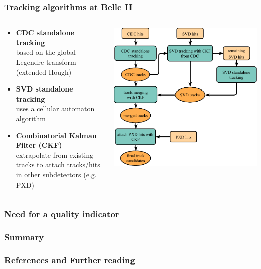 \documentclass[18pt, aspectratio=169]{beamer}
\newcommand{\kitemph}[1]{\textcolor{kit-green100}{\bf{#1}}}
\begin{document}
\begin{frame}
  \frametitle{Tracking algorithms at Belle II}
  \begin{columns}
    \begin{column}{0.53\textwidth}
      \begin{itemize}
      \item \kitemph{CDC standalone tracking}\\
        based on the global Legendre transform (extended Hough)
      \item \kitemph{SVD standalone tracking}\\
        uses a cellular automaton algorithm
      \item \kitemph{Combinatorial Kalman Filter (CKF)}\\
        extrapolate from existing tracks to attach tracks/hits in other subdetectors (e.g. PXD)
      \end{itemize}
    \end{column}
    \begin{column}{0.47\textwidth}
      \centering
      \includegraphics[width=\textwidth]{figures/full_track_finding_simplified.pdf}
    \end{column}
  \end{columns}
\end{frame}
\begin{frame}
  \frametitle{Need for a quality indicator}
  
\end{frame}
\begin{frame}
  \frametitle{Summary}
\end{frame}
\begin{frame}
  \frametitle{References and Further reading}
\end{frame}
\backupbegin
\end{document}
